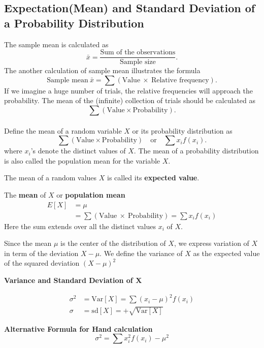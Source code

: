 \documentclass[12pt,a4paper]{article}
\newcommand{\Var}{\text{Var}}
\newcommand{\sd}{\text{sd}}
\begin{document}
\subsection{Expectation(Mean) and Standard Deviation of a Probability Distribution}
The sample mean is calculated as \[
\bar{x}=\frac{\text{Sum of the observations}}{\text{Sample size}}.
\] The another calculation of sample mean illustrates the formula \[
\text{Sample mean}\ \bar{x} = \sum(\text{Value}\ \times\ \text{Relative frequency}).
\] If we imagine a huge number of trials, the relative frequencies will approach the probability. The mean of the (infinite) collection of trials should be calculated as \[
\sum(\text{Value}\times\text{Probability}).
\]
\\
Define the mean of a random variable $X$ or its probability distribution as \[
\sum(\text{Value}\times\text{Probability})\quad\text{or}\quad \sum x_if(x_i).
\] where $x_i$'s denote the distinct values of $X$. The mean of a probability distribution is also called the population mean for the variable $X$. \par
The mean of a random values $X$ is called its \textbf{expected value}. \begin{tcolorbox}[colback=white]
	The \textbf{mean} of $X$ or \textbf{population mean} \begin{align*}
		E[X] &= \mu \\
		&= \sum(\text{Value}\ \times\ \text{Probability})=\sum x_if(x_i)
	\end{align*} Here the sum extends over all the distinct values $x_i$ of $X$.
\end{tcolorbox}
Since the mean $\mu$ is the center of the distribution of $X$, we express variation of $X$ in term of the deviation $X-\mu$. We define the variance of $X$ as the expected value of the squared deviation $(X-\mu)^2$
\begin{tcolorbox}[colback=white]\begin{center}
		\textbf{Variance and Standard Deviation of $\boldsymbol{X}$}
\end{center}\begin{align*}
	\sigma^2 &=\Var[X]=\sum(x_i-\mu)^2f(x_i) \\
	\sigma &=\sd[X]= +\sqrt{\Var[X]}
\end{align*}
\end{tcolorbox}
\begin{tcolorbox}[colback=white]
	\centering
	\textbf{Alternative Formula for Hand calculation} \[
	\sigma^2=\sum x_i^2f(x_i) - \mu^2
	\]
\end{tcolorbox}\ \\
\end{document}
